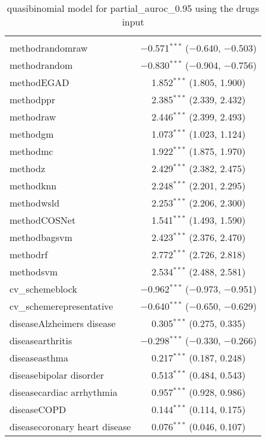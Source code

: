 
\begin{table}[!htbp] \centering 
  \caption{quasibinomial model for partial_auroc_0.95 using the drugs input} 
  \label{} 
\begin{tabular}{@{\extracolsep{5pt}}lc} 
\\[-1.8ex]\hline 
\hline \\[-1.8ex] 
 methodrandomraw & $-$0.571$^{***}$ ($-$0.640, $-$0.503) \\ 
  methodrandom & $-$0.830$^{***}$ ($-$0.904, $-$0.756) \\ 
  methodEGAD & 1.852$^{***}$ (1.805, 1.900) \\ 
  methodppr & 2.385$^{***}$ (2.339, 2.432) \\ 
  methodraw & 2.446$^{***}$ (2.399, 2.493) \\ 
  methodgm & 1.073$^{***}$ (1.023, 1.124) \\ 
  methodmc & 1.922$^{***}$ (1.875, 1.970) \\ 
  methodz & 2.429$^{***}$ (2.382, 2.475) \\ 
  methodknn & 2.248$^{***}$ (2.201, 2.295) \\ 
  methodwsld & 2.253$^{***}$ (2.206, 2.300) \\ 
  methodCOSNet & 1.541$^{***}$ (1.493, 1.590) \\ 
  methodbagsvm & 2.423$^{***}$ (2.376, 2.470) \\ 
  methodrf & 2.772$^{***}$ (2.726, 2.818) \\ 
  methodsvm & 2.534$^{***}$ (2.488, 2.581) \\ 
  cv\_schemeblock & $-$0.962$^{***}$ ($-$0.973, $-$0.951) \\ 
  cv\_schemerepresentative & $-$0.640$^{***}$ ($-$0.650, $-$0.629) \\ 
  diseaseAlzheimers disease & 0.305$^{***}$ (0.275, 0.335) \\ 
  diseasearthritis & $-$0.298$^{***}$ ($-$0.330, $-$0.266) \\ 
  diseaseasthma & 0.217$^{***}$ (0.187, 0.248) \\ 
  diseasebipolar disorder & 0.513$^{***}$ (0.484, 0.543) \\ 
  diseasecardiac arrhythmia & 0.957$^{***}$ (0.928, 0.986) \\ 
  diseaseCOPD & 0.144$^{***}$ (0.114, 0.175) \\ 
  diseasecoronary heart disease & 0.076$^{***}$ (0.046, 0.107) \\ 

\end{tabular}
\end{table}

